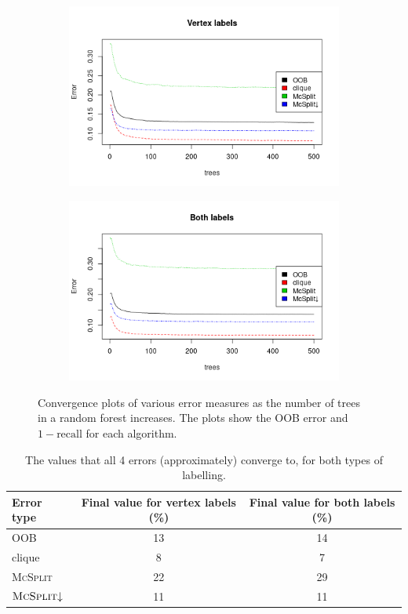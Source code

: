 \documentclass{l4proj}
\theoremstyle{definition}
\theoremstyle{remark}
\begin{document}
\begin{figure}
  \centering
  \begin{subfigure}[t]{0.49\textwidth}
    \centering
    \includegraphics[width=\textwidth]{images/vertex_labels_forest_errors.png}
  \end{subfigure}
  \begin{subfigure}[t]{0.49\textwidth}
    \centering
    \includegraphics[width=\textwidth]{images/both_labels_forest_errors.png}
  \end{subfigure}
  \caption{Convergence plots of various error measures as the number of trees in
    a random forest increases. The plots show the OOB error and $1 -
    \text{recall}$ for each algorithm.}
  \label{fig:forest_errors}
\end{figure}

\begin{table}
  \centering
  \begin{tabular}{l c c}
    Error type & Final value for vertex labels (\%) & Final value for both labels (\%) \\
    \hline
    OOB & 13 & 14 \\
    clique & 8 & 7 \\
    \textsc{McSplit} & 22 & 29 \\
    $\textsc{McSplit}{\downarrow}$ & 11 & 11
  \end{tabular}
  \caption{The values that all 4 errors (approximately) converge to, for both
    types of labelling.}
  \label{table:errors}
\end{table}
\end{document}
